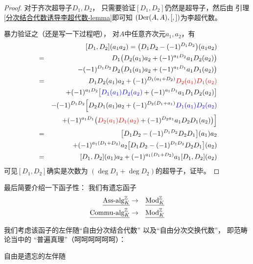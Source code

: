 \begin{proof}对于齐次超导子$D_1,D_2$，
只需要验证$[D_1,D_2]$仍然是超导子，然后由
引理\ref{分次结合代数诱导李超代数-lemma}即可知
$(\operatorname{Der}(A,A),[,])$为李超代数。

暴力验证之（还是写一下过程吧），
对$A$中任意齐次元$a_1,a_2$，有
\begin{eqnarray*}
& &
     [D_1,D_2](a_1a_2)
 =
     \big(
       D_1D_2-(-1)^{D_1D_2}
     \big)
     (a_1a_2)\\
&=&
     D_1\big(
          D_2(a_1)a_2+(-1)^{a_1D_2}a_1D_2(a_2)
        \big)\\
& &
    -(-1)^{D_1D_2}D_2
    \big(
      D_1(a_1)a_2+(-1)^{a_1D_1}a_1D_1(a_2)
    \big)\\
&=&
    D_1D_2(a_1)a_2
    +(-1)^{D_1(a_1+D_2)}
    {\color{red}
      D_2(a_1)D_1(a_2)
    }\\
& &
    +(-1)^{a_1D_2}
    \big[
      {\color{blue}
        D_1(a_1)D_2(a_2)
      }
      +(-1)^{a_1D_1}
      a_1D_1D_2(a_2)
    \big]\\
& &
    -(-1)^{D_1D_2}
    \Big[
      D_2D_1(a_1)a_2
      +(-1)^{D_2(D_1+a_1)}
      {\color{blue}
        D_1(a_1)D_2(a_2)
      }\\
& &
    +(-1)^{a_1D_1}
    \big(
      {\color{red}
        D_2(a_1)D_1(a_2)
      }
      +(-1)^{D_2a_1}a_1D_2D_1(a_2)
    \big)
    \Big]\\
&=&
    \big[
      D_1D_2-(-1)^{D_1D_2}D_2D_1
    \big](a_1)a_2\\
& &
    +(-1)^{a_1(D_1+D_2)}a_2
    \big[
      D_1D_2-(-1)^{D_1D_2}D_2D_1
    \big](a_2)\\
&=&
    [D_1,D_2](a_1)a_2
    +(-1)^{a_1(D_1+D_2)}a_1[D_1,D_2](a_2)
\end{eqnarray*}
可见$[D_1,D_2]$确实是次数为
$(\deg D_1+\deg D_2)$的超导子，证毕。
\end{proof}\vs

最后简要介绍一下函子性：
我们有遗忘函子
\begin{eqnarray*}
\underline{\operatorname{Ass}\!\text{-}\!\operatorname{alg}^{\mathbb{Z}}_{K}}   &\to& \underline{\operatorname{Mod}^{\mathbb{Z}}_{K}}\\
\underline{\operatorname{Commu}\!\text{-}\!\operatorname{alg}^{\mathbb{Z}}_{K}} &\to& \underline{\operatorname{Mod}^{\mathbb{Z}}_{K}}
\end{eqnarray*}

我们考虑该函子的左伴随“自由分次结合代数”
以及“自由分次交换代数”，
即范畴论当中的
{\color{gray}“普遍真理”（呵呵呵呵呵呵）}：

{\begin{center}
\Large 自由是遗忘的左伴随
\end{center}}

